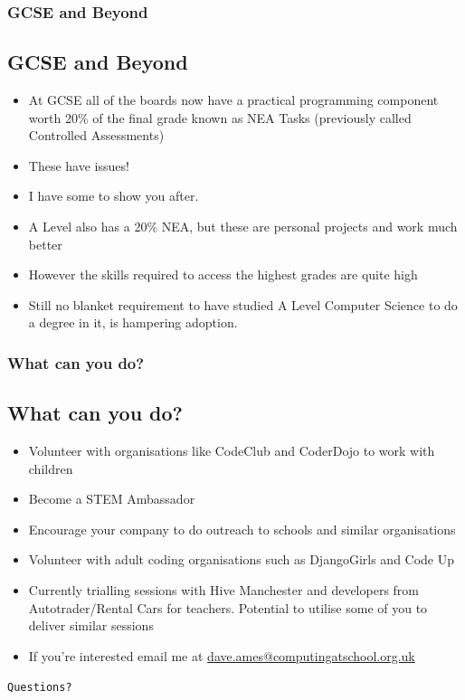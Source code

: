 \documentclass{beamer}
\begin{document}
\begin{frame}
\frametitle{GCSE and Beyond}
\subsection{GCSE and Beyond}
\begin{itemize}
  \item At GCSE all of the boards now have a practical programming component worth 20\% of the final grade known as NEA
    Tasks (previously called Controlled Assessments)
    \pause
  \item These have issues!
    \pause
  \item I have some to show you after.
    \pause
  \item A Level also has a 20\% NEA, but these are personal projects and work much better
    \pause
  \item However the skills required to access the highest grades are quite high
    \pause
  \item Still no blanket requirement to have studied A Level Computer Science to do a degree in it, is hampering
    adoption.   
\end{itemize}

\end{frame}


\begin{frame}
\frametitle{What can you do?}
\subsection{What can you do?}
\begin{itemize}
\item Volunteer with organisations like CodeClub and CoderDojo to work with children
  \pause
\item Become a STEM Ambassador
  \pause
\item Encourage your company to do outreach to schools and similar organisations
  \pause
\item Volunteer with adult coding organisations such as DjangoGirls and Code Up
  \pause
\item Currently trialling sessions with Hive Manchester and developers from Autotrader/Rental Cars for
  teachers. Potential to utilise some of you to deliver similar sessions
  \pause
\item If you're interested email me at \url{dave.ames@computingatschool.org.uk}
\end{itemize}

\end{frame}

  
\begin{frame}
\begin{center}
\begin{huge}
  \texttt{Questions?}
\end{huge}
\end{center}
\normalfont
\end{frame}
  
\end{document}
